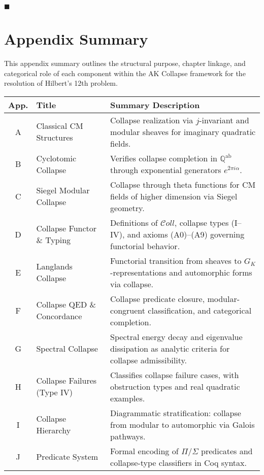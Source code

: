 \documentclass[11pt]{article}
\begin{document}
\hfill $\blacksquare$



\section*{Appendix Summary}

This appendix summary outlines the structural purpose, chapter linkage, and categorical role of each component within the AK Collapse framework for the resolution of Hilbert’s 12th problem.

\vspace{1em}
\begin{center}
\renewcommand{\arraystretch}{1.3}
\begin{tabular}{@{}cp{3.9cm}>{\raggedright\arraybackslash}p{11.8cm}@{}}
\toprule
\textbf{App.} & \textbf{Title} & \textbf{Summary Description} \\
\midrule
A & Classical CM Structures & Collapse realization via \( j \)-invariant and modular sheaves for imaginary quadratic fields. \\
B & Cyclotomic Collapse & Verifies collapse completion in \( \mathbb{Q}^{\mathrm{ab}} \) through exponential generators \( e^{2\pi i\alpha} \). \\
C & Siegel Modular Collapse & Collapse through theta functions for CM fields of higher dimension via Siegel geometry. \\
D & Collapse Functor \& Typing & Definitions of \( \mathcal{C}oll \), collapse types (I–IV), and axioms (A0)–(A9) governing functorial behavior. \\
E & Langlands Collapse & Functorial transition from sheaves to \( G_K \)-representations and automorphic forms via collapse. \\
F & Collapse QED \& Concordance & Collapse predicate closure, modular-congruent classification, and categorical completion. \\
G & Spectral Collapse & Spectral energy decay and eigenvalue dissipation as analytic criteria for collapse admissibility. \\
H & Collapse Failures (Type IV) & Classifies collapse failure cases, with obstruction types and real quadratic examples. \\
I & Collapse Hierarchy & Diagrammatic stratification: collapse from modular to automorphic via Galois pathways. \\
J & Predicate System & Formal encoding of \( \Pi \)/\( \Sigma \) predicates and collapse-type classifiers in Coq syntax. \\

\end{tabular}
\end{center}
\end{document}
